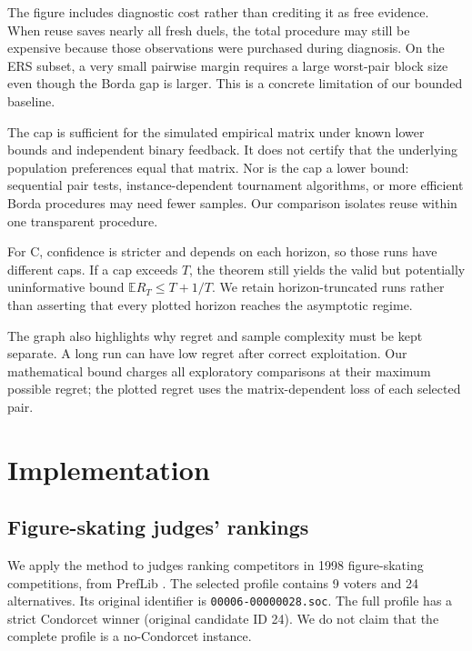 \documentclass[11pt,a4paper]{article}
\newcommand{\E}{\mathbb E}
\begin{document}
The figure includes diagnostic cost rather than crediting it as free evidence. When reuse saves nearly all fresh duels, the total procedure may still be expensive because those observations were purchased during diagnosis. On the ERS subset, a very small pairwise margin requires a large worst-pair block size even though the Borda gap is larger. This is a concrete limitation of our bounded baseline.

The cap is sufficient for the simulated empirical matrix under known lower bounds and independent binary feedback. It does not certify that the underlying population preferences equal that matrix. Nor is the cap a lower bound: sequential pair tests, instance-dependent tournament algorithms, or more efficient Borda procedures may need fewer samples. Our comparison isolates reuse within one transparent procedure.

For C, confidence is stricter and depends on each horizon, so those runs have different caps. If a cap exceeds $T$, the theorem still yields the valid but potentially uninformative bound $\E R_T\le T+1/T$. We retain horizon-truncated runs rather than asserting that every plotted horizon reaches the asymptotic regime.

The graph also highlights why regret and sample complexity must be kept separate. A long run can have low regret after correct exploitation. Our mathematical bound charges all exploratory comparisons at their maximum possible regret; the plotted regret uses the matrix-dependent loss of each selected pair.

\FloatBarrier\section{Implementation}
\subsection{Figure-skating judges' rankings}
We apply the method to judges ranking competitors in 1998 figure-skating competitions, from PrefLib \cite{skate}. The selected profile contains 9 voters and 24 alternatives. Its original identifier is \texttt{00006-00000028.soc}. The full profile has a strict Condorcet winner (original candidate ID 24). We do not claim that the complete profile is a no-Condorcet instance.
\end{document}
